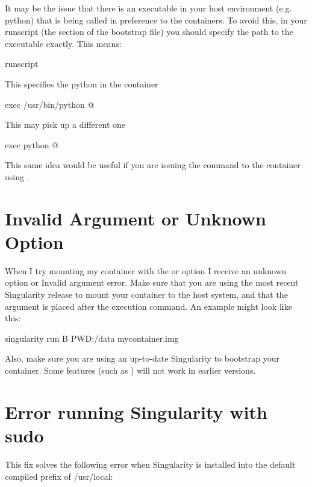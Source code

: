 \documentclass[letterpaper,10pt,english]{sphinxmanual}
\begin{document}
It may be the issue that there is an executable in your host
environment (e.g. python) that is being called in preference to the
containers. To avoid this, in your runscript (the  section of the
bootstrap file) you should specify the path to the executable exactly.
This means:

%
\begin{sphinxVerbatim}[commandchars=\\\{\}]
\PYGZpc{}runscript


\PYGZsh{} This specifies the python in the container

exec /usr/bin/python \PYGZdq{}\PYGZdl{}@\PYGZdq{}


\PYGZsh{} This may pick up a different one

exec python \PYGZdq{}\PYGZdl{}@\PYGZdq{}
\end{sphinxVerbatim}

This same idea would be useful if you are issuing the command to the
container using .


\section{Invalid Argument or Unknown Option}
\label{\detokenize{troubleshooting:invalid-argument-or-unknown-option}}
When I try mounting my container with the  or  option I receive an
unknown option or Invalid argument error.
Make sure that you are using the most recent Singularity release to
mount your container to the host system, and that the  argument is
placed after the execution command. An example might look like this:

%
\begin{sphinxVerbatim}[commandchars=\\\{\}]
\PYGZdl{} singularity run \PYGZhy{}B \PYGZdl{}PWD:/data my\PYGZus{}container.img
\end{sphinxVerbatim}

Also, make sure you are using an up-to-date Singularity to bootstrap
your container. Some features (such as  ) will not work in earlier
versions.


\section{Error running Singularity with sudo}
\label{\detokenize{troubleshooting:error-running-singularity-with-sudo}}
This fix solves the following error when Singularity is installed into
the default compiled prefix of /usr/local:
\end{document}
